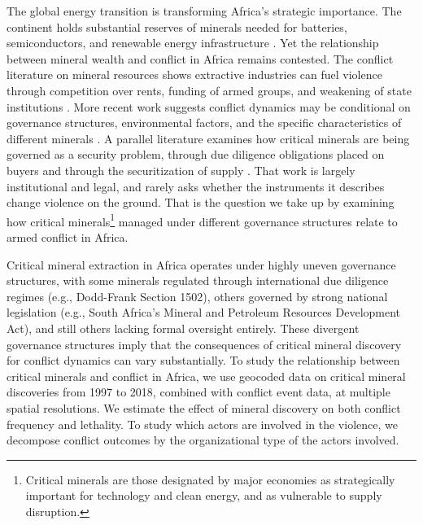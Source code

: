 \documentclass[11pt]{article}
\begin{document}
The global energy transition is transforming Africa's strategic importance. The continent holds substantial reserves of minerals needed for batteries, semiconductors, and renewable energy infrastructure \citep{iea2021critical}. Yet the relationship between mineral wealth and conflict in Africa remains contested. The conflict literature on mineral resources shows extractive industries can fuel violence through competition over rents, funding of armed groups, and weakening of state institutions \citep{ross2004does, collier2004greed, lujala2009deadly, lujala2010spoils, fearon2005primary}. More recent work suggests conflict dynamics may be conditional on governance structures, environmental factors, and the specific characteristics of different minerals \citep{bazzi2019promises, berman2017mine, sanchez2020mining, buhaug2015climate, vonuexkull2016civil, koubi2019climate}. A parallel literature examines how critical minerals are being governed as a security problem, through due diligence obligations placed on buyers and through the securitization of supply \citep{deberdt2025critical, park2026two, schilling2026governing, bijlmakers2026navigating}. That work is largely institutional and legal, and rarely asks whether the instruments it describes change violence on the ground. That is the question we take up by examining how critical minerals\footnote{Critical minerals are those designated by major economies as strategically important for technology and clean energy, and as vulnerable to supply disruption.} managed under different governance structures relate to armed conflict in Africa.

Critical mineral extraction in Africa operates under highly uneven governance structures, with some minerals regulated through international due diligence regimes (e.g., Dodd-Frank Section 1502), others governed by strong national legislation (e.g., South Africa's Mineral and Petroleum Resources Development Act), and still others lacking formal oversight entirely. These divergent governance structures imply that the consequences of critical mineral discovery for conflict dynamics can vary substantially. To study the relationship between critical minerals and conflict in Africa, we use geocoded data on critical mineral discoveries from 1997 to 2018, combined with conflict event data, at multiple spatial resolutions. We estimate the effect of mineral discovery on both conflict frequency and lethality. To study which actors are involved in the violence, we decompose conflict outcomes by the organizational type of the actors involved.
\end{document}
